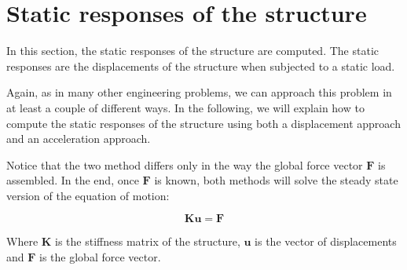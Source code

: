 \section{Static responses of the structure}
\label{sec:static_responses}

In this section, the static responses of the structure are computed.
The static responses are the displacements of the structure when subjected to a static load.

Again, as in many other engineering problems, we can approach this problem in at least a couple of different ways.
In the following, we will explain how to compute the static responses of the structure using both a displacement approach and an acceleration approach.

Notice that the two method differs only in the way the global force vector $\mathbf{F}$ is assembled.
In the end, once $\mathbf{F}$ is known, both methods will solve the steady state version of the equation of motion:

\begin{equation}
    \mathbf{K} \mathbf{u} = \mathbf{F}
    \label{eq:static_responses}
\end{equation}

Where $\mathbf{K}$ is the stiffness matrix of the structure, $\mathbf{u}$ is the vector of displacements and $\mathbf{F}$ is the global force vector.



